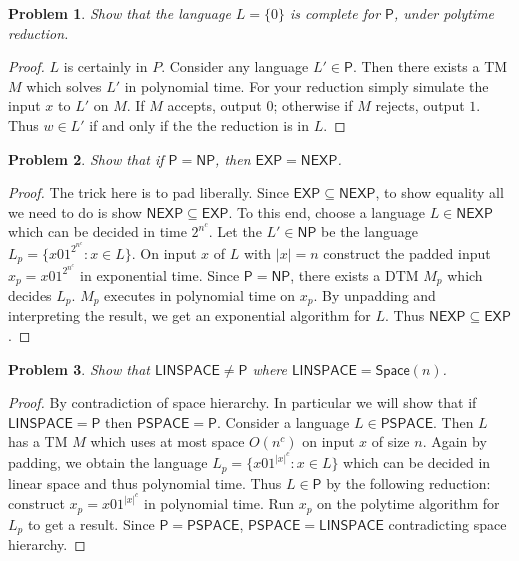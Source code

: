 \documentclass[11pt]{article}
\def\P{\mathsf{P}}
\def\NP{\mathsf{NP}}
\def\EXP{\mathsf{EXP}}
\def\NEXP{\mathsf{NEXP}}
\def\LINSPACE{\mathsf{LINSPACE}}
\def\Space{\mathsf{Space}}
\def\PSPACE{\mathsf{PSPACE}}
\newtheorem{problem}{Problem}
\begin{document}
\begin{problem}
Show that the language $L = \{0\}$ is complete for $\P$, under polytime reduction.
\end{problem}
\begin{proof}
$L$ is certainly in $P$. Consider any language $L' \in \P$. Then there exists a TM $M$ which solves $L'$ in polynomial time. For your reduction simply simulate the input $x$ to $L'$ on $M$. If $M$ accepts, output $0$; otherwise if $M$ rejects, output $1$. Thus $w \in L'$ if and only if the the reduction is in $L$. 
\end{proof}


\begin{problem}
Show that if $\P = \NP$, then $\EXP = \NEXP$.
\end{problem}
\begin{proof}
The trick here is to pad liberally. Since $\EXP \subseteq \NEXP$, to show equality all we need to do is show $\NEXP \subseteq \EXP$. To this end, choose a language $L \in \NEXP$ which can be decided in time $2^{n^c}$. Let the $L' \in \NP$ be the language $L_{p} = \{x01^{2^{n^c}}: x \in L\}$. On input $x$ of $L$ with $|x| = n$ construct the padded input $x_p = x01^{2^{n^c}}$ in exponential time. Since $\P = \NP$, there exists a DTM $M_p$ which decides $L_p$. $M_p$ executes in polynomial time on $x_p$. By unpadding and interpreting the result, we get an exponential algorithm for $L$. Thus $\NEXP \subseteq \EXP$.     
\end{proof}


\begin{problem}
Show that $\LINSPACE \neq \P$ where $\LINSPACE = \Space(n)$.
\end{problem}
\begin{proof}
By contradiction of space hierarchy. In particular we will show that if $\LINSPACE = \P$ then $\PSPACE = \P$. Consider a language $L \in \PSPACE$. Then $L$ has a TM $M$ which uses at most space $O(n^c)$ on input $x$ of size $n$. Again by padding, we obtain the language $L_p = \{x01^{|x|^c}: x \in L\}$ which can be decided in linear space and thus polynomial time. Thus $L \in \P$ by the following reduction: construct $x_p = x01^{|x|^c}$ in polynomial time. Run $x_p$ on the polytime algorithm for $L_p$ to get a result. Since $\P = \PSPACE$, $\PSPACE = \LINSPACE$ contradicting space hierarchy.        
\end{proof}
\end{document}
